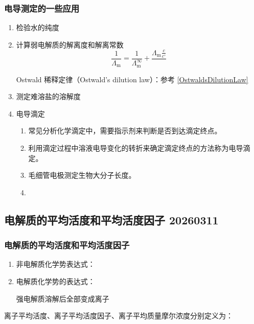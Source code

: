 \subsubsection{电导测定的一些应用}

\begin{enumerate}
    \item 检验水的纯度
    \item 计算弱电解质的解离度和解离常数
    \begin{equation}
        \frac{1}{\Lambda_\mathrm{m}} = \frac{1}{\Lambda_\mathrm{m}^\infty} + \frac{\Lambda_\mathrm{m} \frac{c}{c^\circ}}{} \label{OstwaldsDilutionLaw}
    \end{equation}
    \begin{law}
        Ostwald 稀释定律（Ostwald's dilution law）：参考 \eqref{OstwaldsDilutionLaw}
    \end{law}
    \item 测定难溶盐的溶解度

    \item 电导滴定
    \begin{enumerate}
        \item 常见分析化学滴定中，需要指示剂来判断是否到达滴定终点。
        \item 利用滴定过程中溶液电导变化的转折来确定滴定终点的方法称为电导滴定。
        \item 毛细管电极测定生物大分子长度。%
        \item 
    \end{enumerate}
\end{enumerate}

\subsection{电解质的平均活度和平均活度因子 20260311}

\subsubsection{电解质的平均活度和平均活度因子}
\begin{enumerate}
    \item 非电解质化学势表达式：
    \item 电解质化学势的表达式：
    
    强电解质溶解后全部变成离子
\end{enumerate}

\begin{definition}
    离子平均活度、离子平均活度因子、离子平均质量摩尔浓度分别定义为：
\end{definition}

